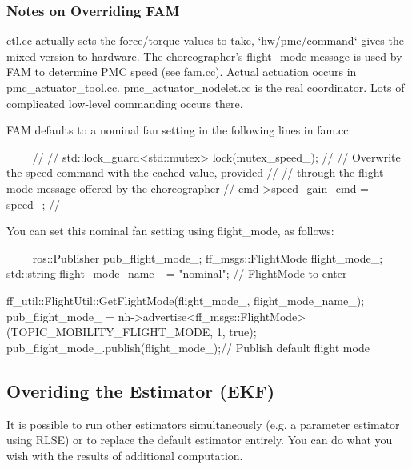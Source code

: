 \documentclass{article}
\begin{document}
\subsubsection{Notes on Overriding FAM}
\begin{markdown}
ctl.cc actually sets the force/torque values to take, `hw/pmc/command` gives the mixed version to hardware. The choreographer's flight\_mode message is used by FAM to determine PMC speed (see fam.cc). Actual actuation occurs in pmc\_actuator\_tool.cc. pmc\_actuator\_nodelet.cc is the real coordinator. Lots of complicated low-level commanding occurs there.

FAM defaults to a nominal fan setting in the following lines in fam.cc:

~~~~
// {
//   std::lock_guard<std::mutex> lock(mutex_speed_);
//   // Overwrite the speed command with the cached value, provided
//   // through the flight mode message offered by the choreographer
//   cmd->speed_gain_cmd = speed_;
// }
 ~~~~
 
You can set this nominal fan setting using flight\_mode, as follows:

~~~~
ros::Publisher pub_flight_mode_;
ff_msgs::FlightMode flight_mode_;
std::string flight_mode_name_ = "nominal";  // FlightMode to enter

ff_util::FlightUtil::GetFlightMode(flight_mode_, flight_mode_name_);
pub_flight_mode_ = nh->advertise<ff_msgs::FlightMode>(TOPIC_MOBILITY_FLIGHT_MODE, 1, true);
pub_flight_mode_.publish(flight_mode_);// Publish default flight mode
~~~~
\end{markdown}

\subsection{Overiding the Estimator (EKF)}

It is possible to run other estimators simultaneously (e.g. a parameter estimator using RLSE) or to replace the default estimator entirely. You can do what you wish with the results of additional computation.
\end{document}
